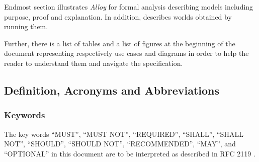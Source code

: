 \documentclass[a4paper]{article}
\begin{document}
        Endmost section illustrates \textit{Alloy} for formal analysis \cite{jackson2006software} describing models including purpose, proof and explanation. In addition, describes worlds obtained by running them.
        
        Further, there is a list of tables and a list of figures at the beginning of the document representing respectively use cases and diagrams in order to help the reader to understand them and navigate the specification.
        
    \subsection{Definition, Acronyms and  Abbreviations}
            \subsubsection{Keywords}
            The key words “MUST”, “MUST NOT”, “REQUIRED”, “SHALL”, “SHALL NOT”, “SHOULD”, “SHOULD NOT”, “RECOMMENDED”, “MAY”, and “OPTIONAL” in this document are to be interpreted as described in RFC 2119 \cite{bradner1997key}.
\end{document}
